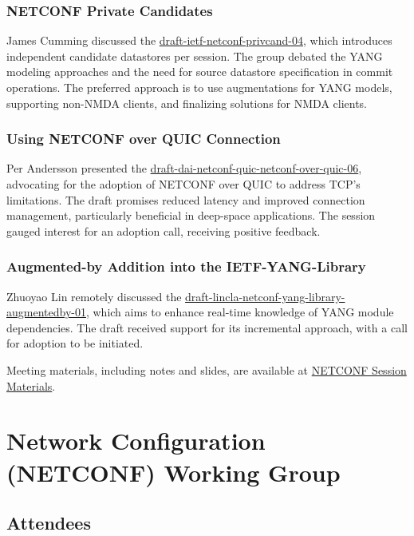 \documentclass{article}
\begin{document}
\subsubsection{NETCONF Private Candidates}
James Cumming discussed the \href{https://datatracker.ietf.org/doc/html/draft-ietf-netconf-privcand-04}{draft-ietf-netconf-privcand-04}, which introduces independent candidate datastores per session. The group debated the YANG modeling approaches and the need for source datastore specification in commit operations. The preferred approach is to use augmentations for YANG models, supporting non-NMDA clients, and finalizing solutions for NMDA clients.

\subsubsection{Using NETCONF over QUIC Connection}
Per Andersson presented the \href{https://datatracker.ietf.org/doc/html/draft-dai-netconf-quic-netconf-over-quic-06}{draft-dai-netconf-quic-netconf-over-quic-06}, advocating for the adoption of NETCONF over QUIC to address TCP's limitations. The draft promises reduced latency and improved connection management, particularly beneficial in deep-space applications. The session gauged interest for an adoption call, receiving positive feedback.

\subsubsection{Augmented-by Addition into the IETF-YANG-Library}
Zhuoyao Lin remotely discussed the \href{https://datatracker.ietf.org/doc/html/draft-lincla-netconf-yang-library-augmentedby-01}{draft-lincla-netconf-yang-library-augmentedby-01}, which aims to enhance real-time knowledge of YANG module dependencies. The draft received support for its incremental approach, with a call for adoption to be initiated.

Meeting materials, including notes and slides, are available at \href{https://datatracker.ietf.org/meeting/120/session/netconf}{NETCONF Session Materials}.



\newpage

\section{Network Configuration (NETCONF) Working Group}

\subsection{Attendees}
\end{document}
